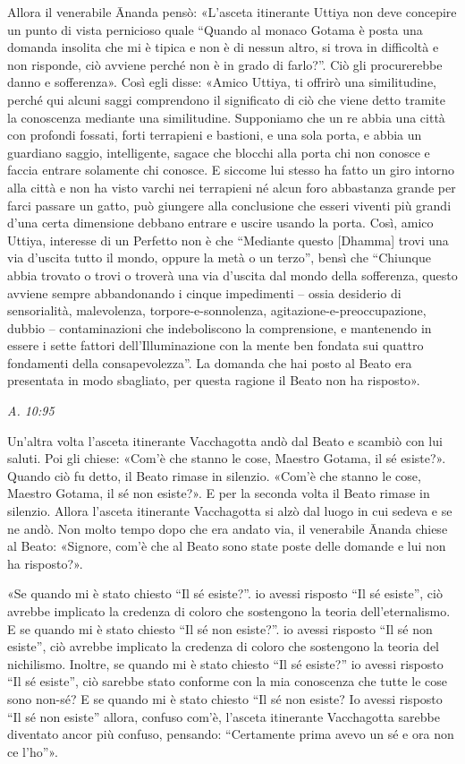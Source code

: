 Allora il venerabile Ānanda pensò: «L’asceta itinerante Uttiya non deve
concepire un punto di vista pernicioso quale “Quando al monaco Gotama è
posta una domanda insolita che mi è tipica e non è di nessun altro, si
trova in difficoltà e non risponde, ciò avviene perché non è in grado di
farlo?”. Ciò gli procurerebbe danno e sofferenza». Così egli disse:
«Amico Uttiya, ti offrirò una similitudine, perché qui alcuni saggi
comprendono il significato di ciò che viene detto tramite la conoscenza
mediante una similitudine. Supponiamo che un re abbia una città con
profondi fossati, forti terrapieni e bastioni, e una sola porta, e abbia
un guardiano saggio, intelligente, sagace che blocchi alla porta chi non
conosce e faccia entrare solamente chi conosce. E siccome lui stesso ha
fatto un giro intorno alla città e non ha visto varchi nei terrapieni né
alcun foro abbastanza grande per farci passare un gatto, può giungere
alla conclusione che esseri viventi più grandi d’una certa dimensione
debbano entrare e uscire usando la porta. Così, amico Uttiya, interesse
di un Perfetto non è che “Mediante questo [Dhamma] trovi una via
d’uscita tutto il mondo, oppure la metà o un terzo”, bensì che “Chiunque
abbia trovato o trovi o troverà una via d’uscita dal mondo della
sofferenza, questo avviene sempre abbandonando i cinque impedimenti –
ossia desiderio di sensorialità, malevolenza, torpore-e-sonnolenza,
agitazione-e-preoccupazione, dubbio – contaminazioni che indeboliscono
la comprensione, e mantenendo in essere i sette fattori
dell’Illuminazione con la mente ben fondata sui quattro fondamenti della
consapevolezza”. La domanda che hai posto al Beato era presentata in
modo sbagliato, per questa ragione il Beato non ha risposto».


\emph{A. 10:95}


Un’altra volta l’asceta itinerante Vacchagotta andò dal Beato e scambiò
con lui saluti. Poi gli chiese: «Com’è che stanno le cose, Maestro
Gotama, il sé esiste?». Quando ciò fu detto, il Beato rimase in
silenzio. «Com’è che stanno le cose, Maestro Gotama, il sé non esiste?».
E per la seconda volta il Beato rimase in silenzio. Allora l’asceta
itinerante Vacchagotta si alzò dal luogo in cui sedeva e se ne andò. Non
molto tempo dopo che era andato via, il venerabile Ānanda chiese al
Beato: «Signore, com’è che al Beato sono state poste delle domande e lui
non ha risposto?».


«Se quando mi è stato chiesto “Il sé esiste?”. io avessi risposto “Il sé
esiste”, ciò avrebbe implicato la credenza di coloro che sostengono la
teoria dell’eternalismo. E se quando mi è stato chiesto “Il sé non
esiste?”. io avessi risposto “Il sé non esiste”, ciò avrebbe implicato
la credenza di coloro che sostengono la teoria del nichilismo. Inoltre,
se quando mi è stato chiesto “Il sé esiste?” io avessi risposto “Il sé
esiste”, ciò sarebbe stato conforme con la mia conoscenza che tutte le
cose sono non-sé? E se quando mi è stato chiesto “Il sé non esiste? Io
avessi risposto “Il sé non esiste” allora, confuso com’è, l’asceta
itinerante Vacchagotta sarebbe diventato ancor più confuso, pensando:
“Certamente prima avevo un sé e ora non ce l’ho”».


